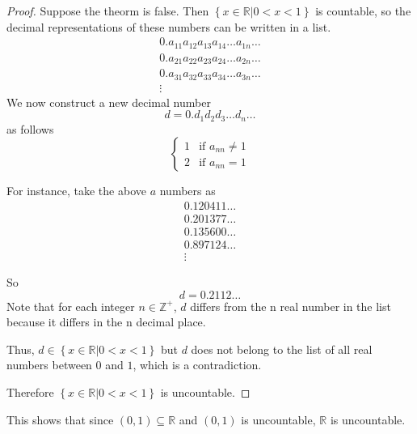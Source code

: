 \begin{proof}
    Suppose the theorm is false.
    Then $\left\{x\in\mathbb R | 0 < x < 1\right\}$ is countable, so the decimal representations of these numbers can be written in a list.
    \begin{equation*}
            \begin{array}{c}
                0.a_{11}a_{12}a_{13}a_{14}\dots a_{1n}\dots \\
                0.a_{21}a_{22}a_{23}a_{24}\dots a_{2n}\dots \\
                0.a_{31}a_{32}a_{33}a_{34}\dots a_{3n}\dots \\
                \vdots
            \end{array}
    \end{equation*}
    We now construct a new decimal number $$d = 0.d_1d_2d_3\dots d_n \dots$$ as follows \begin{equation*}
    \left\{\begin{array}{ll}
        1 & \text{if $a_{nn} \neq 1$} \\
        2 & \text{if $a_{nn} = 1$}
\end{array}\right.
    \end{equation*}

    For instance, take the above $a$ numbers as
    \begin{equation*}
            \begin{array}{c}
                0.120411\dots \\
                0.201377\dots \\
                0.135600\dots \\
                0.897124\dots \\
                \vdots
            \end{array}
    \end{equation*}

    So $$d = 0.2112\dots$$ Note that for each integer $n\in\mathbb Z^+$, $d$ differs from the n real number in the list because it differs in the n decimal place.

    Thus, $d\in\left\{x\in\mathbb R | 0 < x < 1\right\}$ but $d$ does not belong to the list of all real numbers between $0$ and $1$, which is a contradiction.

    Therefore $\left\{x\in\mathbb R | 0 < x < 1\right\}$ is uncountable.
\end{proof}

This shows that since $\left(0,1\right)\subseteq \mathbb R$ and $\left(0,1\right)$ is uncountable, $\mathbb R$ is uncountable.

